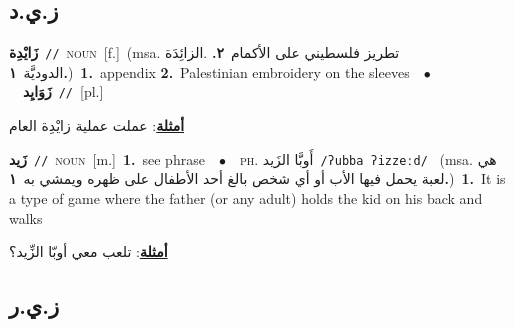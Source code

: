 \documentclass[10pt,a4paper,twoside]{article} %
\begin{document}
\begin{multicols}{2}
\vspace{-3mm}
\subsection*{\color{blue}\foreignlanguage{arabic}{ز.ي.د}\color{blue}{}} 

{\setlength\topsep{0pt}\textbf{\foreignlanguage{arabic}{زَايْدِة}}\ {\color{gray}\texttt{//}\color{black}}\ \textsc{noun}\ [f.]\ \color{gray}(msa. \foreignlanguage{arabic}{تطريز فلسطيني على الأكمام}~\foreignlanguage{arabic}{\textbf{٢.}}  .\foreignlanguage{arabic}{الزائِدَة الدوديَّة}~\foreignlanguage{arabic}{\textbf{١.}})\color{black}\ \textbf{1.}~appendix  \textbf{2.}~Palestinian embroidery on the sleeves\ \ $\bullet$\ \ \setlength\topsep{0pt}\textbf{\foreignlanguage{arabic}{زَوَايِد}}\ {\color{gray}\texttt{//}\color{black}}\ [pl.]\  \begin{flushright}\color{gray}\foreignlanguage{arabic}{\textbf{\underline{\foreignlanguage{arabic}{أمثلة}}}: عملت عملية زايْدِة العام}\end{flushright}\color{black}} \vspace{2mm}

{\setlength\topsep{0pt}\textbf{\foreignlanguage{arabic}{زَيد}}\ {\color{gray}\texttt{//}\color{black}}\ \textsc{noun}\ [m.]\ \textbf{1.}~see phrase\ \ $\bullet$\ \ \textsc{ph.} \color{gray} \foreignlanguage{arabic}{أَوبَّا الزَيد}\color{black}\ {\color{gray}\texttt{/{\sffamily ʔubba ʔizzeːd}/}\color{black}}\ \color{gray} (msa. \foreignlanguage{arabic}{هي لعبة يحمل فيها الأب أو أي شخص بالغ أحد الأطفال على ظهره ويمشي به}~\foreignlanguage{arabic}{\textbf{١.}})\color{black}\ \textbf{1.}~It is a type of game where the father (or any adult) holds the kid on his back and walks\  \begin{flushright}\color{gray}\foreignlanguage{arabic}{\textbf{\underline{\foreignlanguage{arabic}{أمثلة}}}: تلعب معي أوبّا الزِّيد؟}\end{flushright}\color{black}} \vspace{2mm}

\vspace{-3mm}
\subsection*{\color{blue}\foreignlanguage{arabic}{ز.ي.ر}\color{blue}{}} 


\end{multicols}
\end{document}
